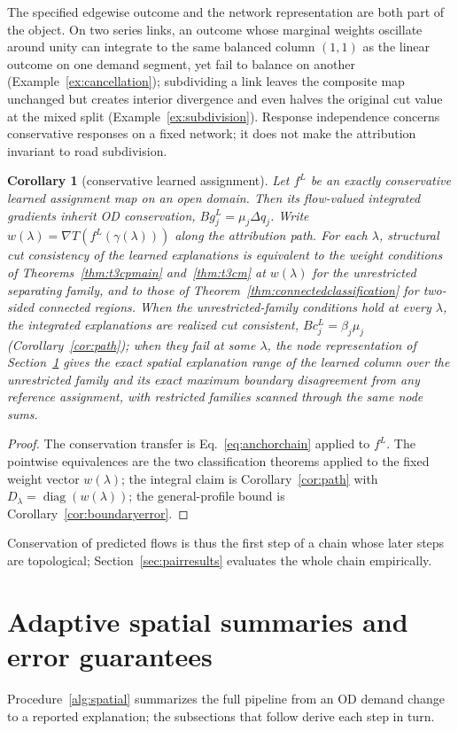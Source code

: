 \documentclass[a4paper,fleqn]{cas-sc}
\newtheorem{corollary}[theorem]{Corollary}
\begin{document}
The specified edgewise outcome and the network representation are both
part of the object. On two series links, an outcome whose marginal
weights oscillate around unity can integrate to the same balanced column
$(1,1)$ as the linear outcome on one demand segment, yet fail to balance
on another (Example~\ref{ex:cancellation}); subdividing a link leaves
the composite map unchanged but creates interior divergence and even
halves the original cut value at the mixed split
(Example~\ref{ex:subdivision}). Response independence concerns
conservative responses on a fixed network; it does not make the attribution
invariant to road subdivision.

\begin{corollary}[conservative learned assignment]\label{cor:learned}
Let $f^L$ be an exactly conservative learned assignment map on an open
domain. Then its flow-valued integrated gradients inherit OD
conservation, $Bg^L_j=\mu_j\Delta q_j$. Write
$w(\lambda)=\nabla T(f^L(\gamma(\lambda)))$ along the attribution path.
For each $\lambda$, structural cut consistency of the learned
explanations is equivalent to the weight conditions of
Theorems~\ref{thm:t3cpmain} and~\ref{thm:t3cm} at $w(\lambda)$ for the
unrestricted separating family, and to those of
Theorem~\ref{thm:connectedclassification} for two-sided connected
regions. When the unrestricted-family conditions hold at every
$\lambda$, the integrated explanations are realized cut consistent,
$Bc^{L}_j=\beta_j\mu_j$
(Corollary~\ref{cor:path}); when they fail at some $\lambda$, the node
representation of Section~\ref{sec:stability} gives the exact spatial
explanation range of the learned column over the unrestricted family
and its exact maximum boundary disagreement from any reference
assignment, with restricted families scanned through the same node
sums.
\end{corollary}
\begin{proof}
The conservation transfer is Eq.~\eqref{eq:anchorchain} applied to
$f^L$. The pointwise equivalences are the two classification theorems
applied to the fixed weight vector $w(\lambda)$; the integral claim is
Corollary~\ref{cor:path} with
$D_\lambda=\operatorname{diag}(w(\lambda))$; the general-profile bound is
Corollary~\ref{cor:boundaryerror}.
\end{proof}
Conservation of predicted flows is thus the first step of a chain whose
later steps are topological; Section~\ref{sec:pairresults} evaluates the
whole chain empirically.

\FloatBarrier
\section{Adaptive spatial summaries and error guarantees}\label{sec:stability}\label{sec:algorithm}
Procedure~\ref{alg:spatial} summarizes the full pipeline from an OD
demand change to a reported explanation; the subsections that follow
derive each step in turn.
\end{document}
